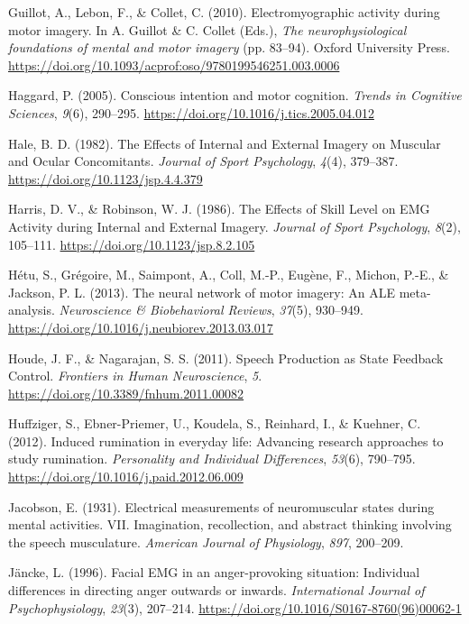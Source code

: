 \documentclass[a4paper,12pt,twoside,openright,oldfontcommands]{memoir}
\begin{document}
\hypertarget{ref-guillot_electromyographic_2010}{}
Guillot, A., Lebon, F., \& Collet, C. (2010). Electromyographic activity
during motor imagery. In A. Guillot \& C. Collet (Eds.), \emph{The
neurophysiological foundations of mental and motor imagery} (pp.
83--94). Oxford University Press.
\url{https://doi.org/10.1093/acprof:oso/9780199546251.003.0006}

\hypertarget{ref-haggard_conscious_2005}{}
Haggard, P. (2005). Conscious intention and motor cognition.
\emph{Trends in Cognitive Sciences}, \emph{9}(6), 290--295.
\url{https://doi.org/10.1016/j.tics.2005.04.012}

\hypertarget{ref-hale_effects_1982}{}
Hale, B. D. (1982). The Effects of Internal and External Imagery on
Muscular and Ocular Concomitants. \emph{Journal of Sport Psychology},
\emph{4}(4), 379--387. \url{https://doi.org/10.1123/jsp.4.4.379}

\hypertarget{ref-harris_effects_1986}{}
Harris, D. V., \& Robinson, W. J. (1986). The Effects of Skill Level on
EMG Activity during Internal and External Imagery. \emph{Journal of
Sport Psychology}, \emph{8}(2), 105--111.
\url{https://doi.org/10.1123/jsp.8.2.105}

\hypertarget{ref-hetu_neural_2013}{}
Hétu, S., Grégoire, M., Saimpont, A., Coll, M.-P., Eugène, F., Michon,
P.-E., \& Jackson, P. L. (2013). The neural network of motor imagery: An
ALE meta-analysis. \emph{Neuroscience \& Biobehavioral Reviews},
\emph{37}(5), 930--949.
\url{https://doi.org/10.1016/j.neubiorev.2013.03.017}

\hypertarget{ref-houde_speech_2011}{}
Houde, J. F., \& Nagarajan, S. S. (2011). Speech Production as State
Feedback Control. \emph{Frontiers in Human Neuroscience}, \emph{5}.
\url{https://doi.org/10.3389/fnhum.2011.00082}

\hypertarget{ref-Huffziger2012}{}
Huffziger, S., Ebner-Priemer, U., Koudela, S., Reinhard, I., \& Kuehner,
C. (2012). Induced rumination in everyday life: Advancing research
approaches to study rumination. \emph{Personality and Individual
Differences}, \emph{53}(6), 790--795.
\url{https://doi.org/10.1016/j.paid.2012.06.009}

\hypertarget{ref-jacobson_electrical_1931}{}
Jacobson, E. (1931). Electrical measurements of neuromuscular states
during mental activities. VII. Imagination, recollection, and abstract
thinking involving the speech musculature. \emph{American Journal of
Physiology}, \emph{897}, 200--209.

\hypertarget{ref-Jancke1996a}{}
Jäncke, L. (1996). Facial EMG in an anger-provoking situation:
Individual differences in directing anger outwards or inwards.
\emph{International Journal of Psychophysiology}, \emph{23}(3),
207--214. \url{https://doi.org/10.1016/S0167-8760(96)00062-1}
\end{document}
